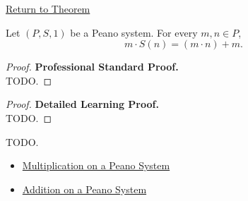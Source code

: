 \newpage
{}
\label{prf:multiplication-successor-on-right}

\begin{remark*}[Return]
\hyperref[thm:multiplication-successor-on-right]{Return to Theorem}
\end{remark*}

\begin{theorem*}
Let $(P,S,1)$ be a Peano system. For every $m,n \in P$,
\[
m \cdot S(n) = (m \cdot n) + m.
\]
\end{theorem*}

\begin{proof}
\textbf{Professional Standard Proof.}~\\
TODO.
\end{proof}

\begin{proof}
\textbf{Detailed Learning Proof.}~\\
TODO.
\end{proof}

\begin{remark*}
TODO.
\end{remark*}

\begin{dependencies}
\begin{itemize}
  \item \hyperref[def:multiplication-on-peano-system]{Multiplication on a Peano System}
  \item \hyperref[def:addition-on-peano-system]{Addition on a Peano System}
\end{itemize}
\end{dependencies}
